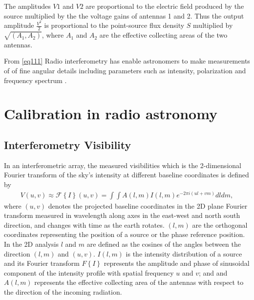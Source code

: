 The amplitudes $V1$ and $V2$ are proportional to the electric field produced by the  source multiplied by the the voltage gains of antennas 1 and 2.  Thus the output amplitude $\frac{V^2}{2}$ is proportional to the point-source flux density $S$ multiplied by $\sqrt{(A_1, A_2)}$, where $A_1$ and $A_2$ are the effective collecting areas of the two antennas.

From \ref{eq111} 
Radio interferometry has enable astronomers to make measurements of  of fine angular  details including parameters such as intensity, polarization and frequency spectrum \citep{thompson2001interferometry}.

\section{Calibration in radio astronomy}
\label{Calibr}
\subsection{Interferometry Visibility}
In an interferometric array, the measured visibilities  which is the 2-dimensional Fourier transform of the sky's intensity at different baseline coordinates is defined by
\begin{align}
V(u,v)\approx \mathcal{F}\left\{I\right\}(u,v)=\int \int A(l,m) I (l,m)e^{-2\pi i(ul+vm)} dl dm,
\label{Vis}
\end{align}
where $(u,v)$ denotes the projected baseline coordinates in the 2D plane Fourier transform measured in wavelength along axes in the east-west and north south direction,  and changes with time as the earth rotates. $(l, m)$ are the orthogonal coordinates representing the position of a source or the phase reference position. In the 2D analysis $l$ and $m$ are defined as the cosines of the  angles between the direction $(l,m)$ and $(u, v)$. $I(l,m)$ is the intensity distribution of a source and its Fourier transform  ${F}\left\{I\right\}$ represents the amplitude and phase of sinusoidal component of the intensity profile with spatial frequency $u$ and $v$; and and $A(l, m)$ represents the effective collecting area of the antennas with respect to the direction of the incoming radiation.

